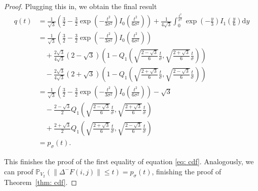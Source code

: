 \documentclass[a4paper,12pt]{article}
\newcommand{\norm}[1]{\lVert#1\rVert}
\theoremstyle{plain}
\theoremstyle{definition}
\numberwithin{equation}{section}
\begin{document}
\begin{proof}
	Plugging this in, we obtain the final result
	\begin{align*}
		q(t) &= \frac{1}{\sqrt{3}} \left( \frac{3}{2} - \frac{3}{2} \exp \left( - \frac{t^2}{3 \sigma^2} \right) I_0 \left( \frac{t^2}{6 \sigma^2} \right) \right) + \frac{1}{4 \sqrt{3}} \int_0^\frac{t^2}{\sigma^2} \exp \left( - \frac{y}{3} \right) I_1 \left( \frac{y}{6} \right) \mathrm{d}y \\
		&= \frac{1}{\sqrt{3}} \left( \frac{3}{2} - \frac{3}{2} \exp \left( - \frac{t^2}{3 \sigma^2} \right) I_0 \left( \frac{t^2}{6 \sigma^2} \right) \right) \\
		&\quad + \frac{2 \sqrt{3}}{4 \sqrt{3}} (2 - \sqrt{3}) \left( 1 - Q_1 \left( \sqrt{\frac{2 - \sqrt{3}}{6}} \frac{t}{\sigma}, \sqrt{\frac{2 + \sqrt{3}}{6}} \frac{t}{\sigma} \right) \right) \\
		&\quad - \frac{2 \sqrt{3}}{4 \sqrt{3}} (2 + \sqrt{3}) \left( 1 - Q_1 \left( \sqrt{\frac{2 + \sqrt{3}}{6}} \frac{t}{\sigma}, \sqrt{\frac{2 - \sqrt{3}}{6}} \frac{t}{\sigma} \right) \right) \\
		&= \frac{1}{\sqrt{3}} \left( \frac{3}{2} - \frac{3}{2} \exp \left( - \frac{t^2}{3 \sigma^2} \right) I_0 \left( \frac{t^2}{6 \sigma^2} \right) \right) - \sqrt{3} \\
		&\quad - \frac{2 - \sqrt{3}}{2} Q_1 \left( \sqrt{\frac{2 - \sqrt{3}}{6}} \frac{t}{\sigma}, \sqrt{\frac{2 + \sqrt{3}}{6}} \frac{t}{\sigma} \right) \\
		&\quad + \frac{2 + \sqrt{3}}{2} Q_1 \left( \sqrt{\frac{2 + \sqrt{3}}{6}} \frac{t}{\sigma}, \sqrt{\frac{2 - \sqrt{3}}{6}} \frac{t}{\sigma} \right) \\
		&= p_\sigma(t).
	\end{align*}
	
	This finishes the proof of the first equality of equation \eqref{eq: cdf}. Analogously, we can proof $\mathbb{P}_{V_2}( \norm{\Delta^- F(i, j)} \leq t ) = p_\sigma(t)$, finishing the proof of Theorem~\ref{thm: cdf}.
\end{proof}
\end{document}

